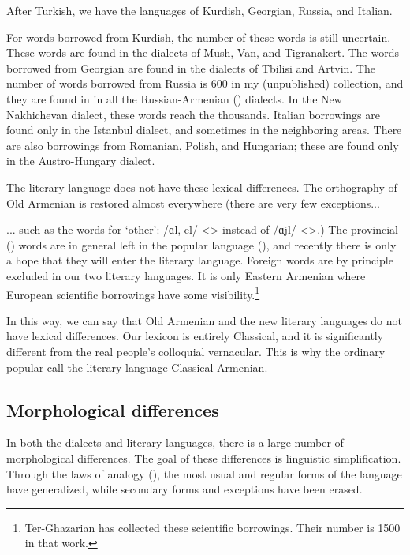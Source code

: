 After Turkish, we have the languages of Kurdish, Georgian, Russia, and Italian. 

For words borrowed from Kurdish, the number of these words is still uncertain. These words are found in the dialects of Mush, Van, and Tigranakert. The words borrowed from Georgian are found in the dialects of Tbilisi and Artvin. The number of words borrowed from Russia is 600 in my (unpublished) collection, and they are found in in all the Russian-Armenian () dialects. In the New Nakhichevan dialect, these words reach the thousands. Italian borrowings are found only in the Istanbul dialect, and sometimes in the neighboring areas. There are also borrowings from Romanian, Polish, and Hungarian; these are found only in the Austro-Hungary dialect. 

The literary language does not have these lexical differences. The orthography of Old Armenian is restored almost everywhere (there are very few exceptions... 



\begin{adjarianpage}\label{page:20}\end{adjarianpage}%

... such as the words for `other': /ɑl, el/ <> instead of /ɑjl/ <>.) The provincial () words are in general left in the popular language (), and recently there is only a hope that they will enter the literary language. Foreign words are by principle excluded in our two literary languages. It is only Eastern Armenian where European scientific borrowings have some visibility.\footnote{Ter-Ghazarian \citep{DerGhazarian-DictionaryBorrowed} has collected these scientific borrowings. Their number is 1500 in that work.}

In this way, we can say that Old Armenian and the new literary languages do not have lexical differences. Our lexicon is entirely Classical, and it is significantly different from the real people's colloquial vernacular. This is why the ordinary popular call the literary language Classical Armenian. 


\subsection{Morphological differences}
In both the dialects and literary languages, there is a large number of morphological differences. The goal of these differences is linguistic simplification. Through the laws of analogy (), the most usual and regular forms of the language have generalized, while secondary forms and exceptions have been erased.

